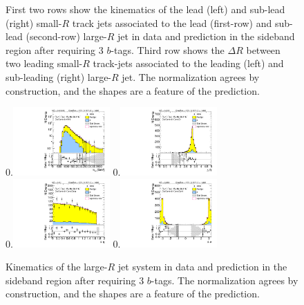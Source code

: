 \begin{figure}[htbp!]
\begin{center}
  \caption{First two rows show the kinematics of the lead (left) and sub-lead (right) small-$R$ track jets associated to the lead (first-row) and sub-lead (second-row) large-$R$ jet in data and prediction in the sideband region after requiring 3 $b$-tags. Third row shows the $\Delta R$ between two leading small-$R$ track-jets associated to the leading (left) and sub-leading (right) large-$R$ jet. The normalization agrees by construction, and the shapes are a feature of the prediction. }
  \label{fig:boosted-3b-control-ak2}
\end{center}
\end{figure}


\begin{figure}[htbp!]
\begin{center}
0.\includegraphics[width=0.33\textwidth, angle=270]{./figures/boosted/Control/Moriond_ThreeTag_Control_mHH_l_1.pdf}
0.\includegraphics[width=0.33\textwidth, angle=270]{./figures/boosted/Control/Moriond_ThreeTag_Control_hCandDr.pdf}\\
0.\includegraphics[width=0.33\textwidth, angle=270]{./figures/boosted/Control/Moriond_ThreeTag_Control_hCandDeta.pdf}
0.\includegraphics[width=0.33\textwidth, angle=270]{./figures/boosted/Control/Moriond_ThreeTag_Control_hCandDphi.pdf}
  \caption{Kinematics of the large-$R$ jet system in data and prediction in the sideband region after requiring 3 $b$-tags. The normalization agrees by construction, and the shapes are a feature of the prediction. }
  \label{fig:boosted-3b-control-ak10-system}
\end{center}
\end{figure}

